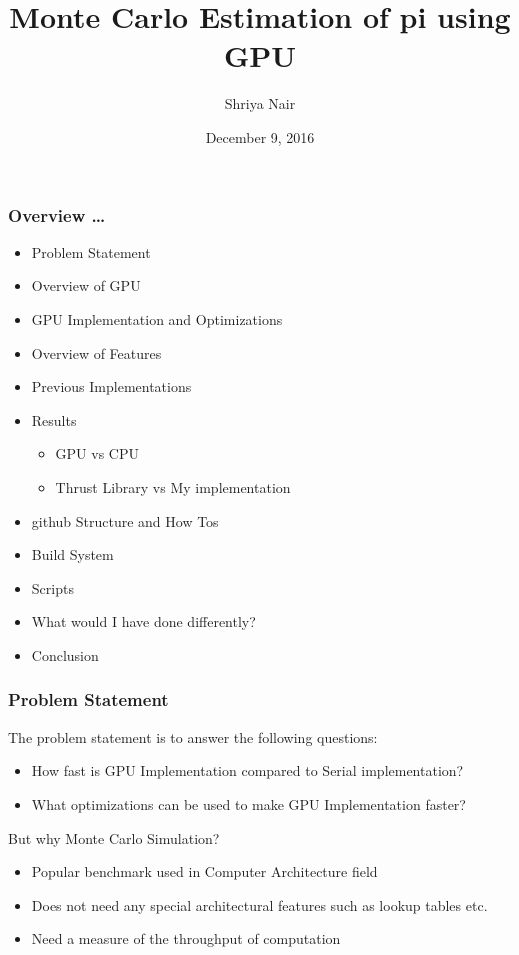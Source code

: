 \documentclass[mathserif]{beamer}
\date{December 9, 2016}
\author[Shriya Nair]{Shriya Nair}
\institute{The University of Texas at Austin}
\title[MC pi using GPU]{Monte Carlo Estimation of pi using GPU}
\begin{document}
\begin{frame}
\begin{center}
\end{center}
\titlepage
\begin{flushright}
\end{flushright}
\end{frame}

\begin{frame}
\frametitle{Overview \ldots}

\begin{itemize}
\item Problem Statement
\item Overview of GPU
\item GPU Implementation and Optimizations
\item Overview of Features
\item Previous Implementations
\item Results   
\begin{itemize}
\item GPU vs CPU
\item Thrust Library vs My implementation
\end{itemize}
\item github Structure and How Tos
\item Build System
\item Scripts 
\item What would I have done differently?
\item Conclusion
\end{itemize}

\end{frame}

\begin{frame}
\frametitle{Problem Statement}

The problem statement is to answer the following questions: 
\begin{itemize}
\item How fast is GPU Implementation compared to Serial implementation?
\item What optimizations can be used to make GPU Implementation faster? 
\end{itemize}
But why Monte Carlo Simulation?
\begin{itemize}
\item Popular benchmark used in Computer Architecture field  
\item Does not need any special architectural features such as lookup tables etc. 
\item Need a measure of the throughput of computation 
\end{itemize}
\end{frame}
\end{document}
